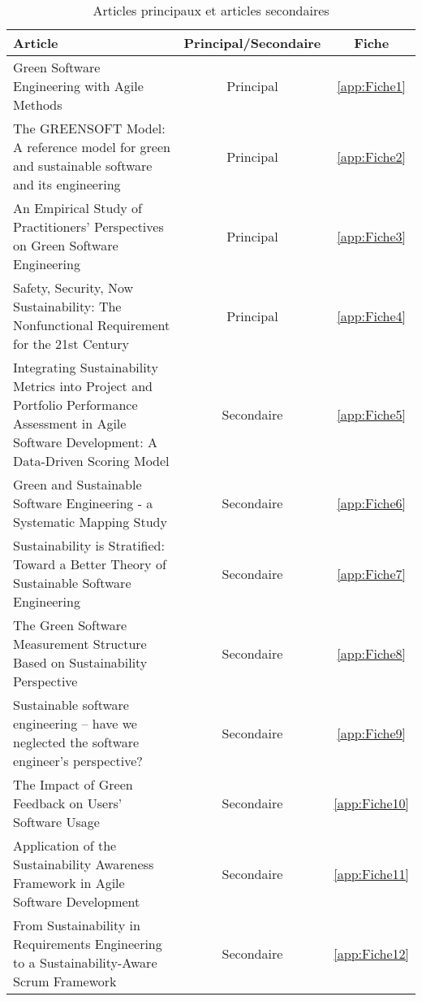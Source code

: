 \begin{table}[htb]
    \small
    \renewcommand{\arraystretch}{1.5}
    \begin{tabularx}{\textwidth}{|X|c|c|}
        \hline
        \textbf{Article} & \textbf{Principal/Secondaire} & \textbf{Fiche}\\ 
        \hline
        Green Software Engineering with Agile Methods & Principal & \ref{app:Fiche1} \\ \hline
        The GREENSOFT Model: A reference model for green and sustainable software and its engineering & Principal & \ref{app:Fiche2} \\ \hline
        An Empirical Study of Practitioners’ Perspectives on Green Software Engineering & Principal & \ref{app:Fiche3} \\ \hline
        Safety, Security, Now Sustainability: The Nonfunctional Requirement for the 21st Century & Principal & \ref{app:Fiche4} \\ \hline
        Integrating Sustainability Metrics into Project and Portfolio Performance Assessment in Agile Software Development: A Data-Driven Scoring Model & Secondaire & \ref{app:Fiche5} \\ \hline
        Green and Sustainable Software Engineering - a Systematic Mapping Study & Secondaire & \ref{app:Fiche6} \\ \hline
        Sustainability is Stratified: Toward a Better Theory of Sustainable Software Engineering & Secondaire & \ref{app:Fiche7} \\ \hline
        The Green Software Measurement Structure Based on Sustainability Perspective & Secondaire & \ref{app:Fiche8} \\ \hline
        Sustainable software engineering – have we neglected the software engineer’s perspective? & Secondaire & \ref{app:Fiche9} \\ \hline
        The Impact of Green Feedback on Users’ Software Usage & Secondaire & \ref{app:Fiche10} \\
        \hline
        Application of the Sustainability Awareness Framework in Agile Software Development & Secondaire & \ref{app:Fiche11} \\ \hline
        From Sustainability in Requirements Engineering to a Sustainability-Aware Scrum Framework & Secondaire & \ref{app:Fiche12} \\ \hline
    \end{tabularx}
    \caption{Articles principaux et articles secondaires}
\end{table}

